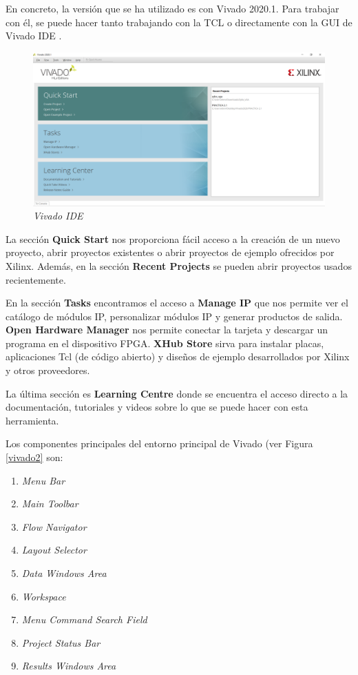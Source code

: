 En concreto, la versión que se ha utilizado es con Vivado 2020.1. Para trabajar con él, se puede hacer tanto trabajando con la TCL o 
directamente con la GUI de Vivado IDE \cite{vivadoIDE}. 
\begin{figure}[H]
    \centering
    \includegraphics[width = 1\textwidth]{imagenes/Vivado1.png}
    \caption{\textit{Vivado IDE}}\label{vivadoGUI}
\end{figure}

La sección \textbf{Quick Start} nos proporciona fácil acceso a la creación de un nuevo proyecto, abrir proyectos existentes o abrir proyectos 
de ejemplo ofrecidos por Xilinx. Además, en la sección \textbf{Recent Projects} se pueden abrir proyectos usados recientemente.

En la sección \textbf{Tasks} encontramos el acceso a \textbf{Manage IP} que nos permite ver el catálogo de módulos IP, personalizar módulos IP y generar 
productos de salida.  \textbf{Open Hardware Manager} nos permite conectar la tarjeta y descargar un programa en el dispositivo FPGA. 
\textbf{XHub Store} sirva para instalar placas, aplicaciones Tcl (de código abierto) y diseños de ejemplo desarrollados por Xilinx y otros proveedores. 

La última sección es \textbf{Learning Centre} donde se encuentra el acceso directo a la documentación, tutoriales y videos sobre lo que se 
puede hacer con esta herramienta.

Los componentes principales del entorno principal de Vivado (ver Figura \ref{vivado2} son:
\begin{enumerate}
    \item \textit{Menu Bar}
    \item \textit{Main Toolbar}
    \item \textit{Flow Navigator}
    \item \textit{Layout Selector}
    \item \textit{Data Windows Area}
    \item \textit{Workspace} 
    \item \textit{Menu Command Search Field} 
    \item \textit{Project Status Bar} 
    \item \textit{Results Windows Area}
\end{enumerate}

